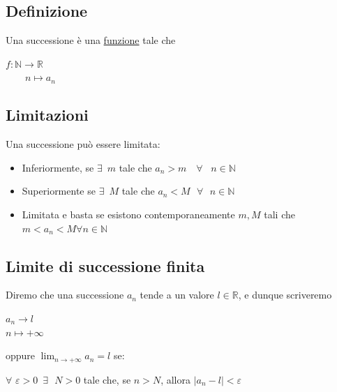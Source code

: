 \documentclass{article}
\theoremstyle{definition}
\begin{document}
\subsection{Definizione}
Una successione è una \underline{funzione} tale che
\begin{center}
$f: \mathbb{N} \to \mathbb{R}$
\\\,\,\,\,\,\,\,\,\,\, $n \mapsto a_n$
\end{center}
\subsection{Limitazioni}
Una successione può essere limitata:
\begin{itemize}
    \item Inferiormente, se $\exists \,\,\, m$ tale che $a_n>m  \,\,\,\,\,\, \forall \,\,\,\,\, n \in \mathbb{N}$
    \item Superiormente se $\exists \,\,\, M$ tale che $a_n<M \,\,\,\, \forall \,\,\,\, n \in \mathbb{N}$
    \item Limitata e basta se esistono contemporaneamente $m,M$ tali che $m<a_n<M \forall n \in \mathbb{N}$
\end{itemize}
\subsection{Limite di successione finita}
Diremo che una successione {$a_n$} tende a un valore $l \in \mathbb{R}$, e dunque scriveremo 
\begin{center}
    $a_n \to l$
    \\ $n \mapsto +\infty$
\end{center}
oppure $\lim_{n \to +\infty}a_n=l$ se:
\begin{center}
    $\forall \,\, \varepsilon > 0 \,\,\, \exists \,\,\,\, N>0$ tale che, se $n>N$, allora $|a_n-l|<\varepsilon$
\end{center}
\begin{center}
\end{center}
\end{document}
